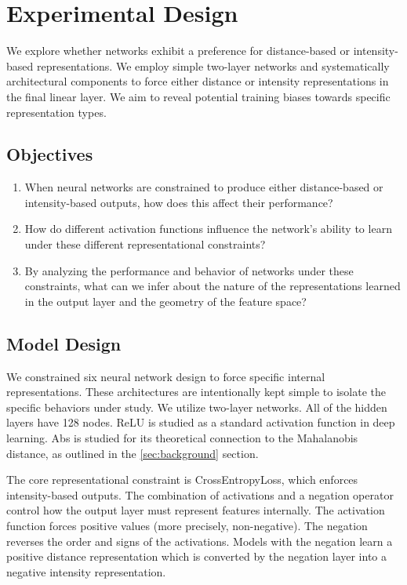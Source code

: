 \section{Experimental Design}
\label{sec:exp_design}

We explore whether networks exhibit a preference for distance-based or intensity-based representations. We employ simple two-layer networks and systematically architectural components to force either distance or intensity representations in the final linear layer. We aim to reveal potential training biases towards specific representation types.

\subsection{Objectives}
\begin{enumerate}
    \item When neural networks are constrained to produce either distance-based or intensity-based outputs, how does this affect their performance?
    
    \item How do different activation functions influence the network's ability to learn under these different representational constraints?
    \item By analyzing the performance and behavior of networks under these constraints, what can we infer about the nature of the representations learned in the output layer and the geometry of the feature space?
\end{enumerate}


\subsection{Model Design}

We constrained six neural network design to force specific internal representations. These architectures are intentionally kept simple to isolate the specific behaviors under study. We utilize two-layer networks. All of the hidden layers have 128 nodes. ReLU is studied as a standard activation function in deep learning. Abs is studied for its theoretical connection to the Mahalanobis distance, as outlined in the \ref{sec:background} section.

The core representational constraint is CrossEntropyLoss, which enforces intensity-based outputs. The combination of activations and a negation operator control how the output layer must represent features internally. The activation function forces positive values (more precisely, non-negative). The negation reverses the order and signs of the activations. Models with the negation learn a positive distance representation which is converted by the negation layer into a negative intensity representation. 

